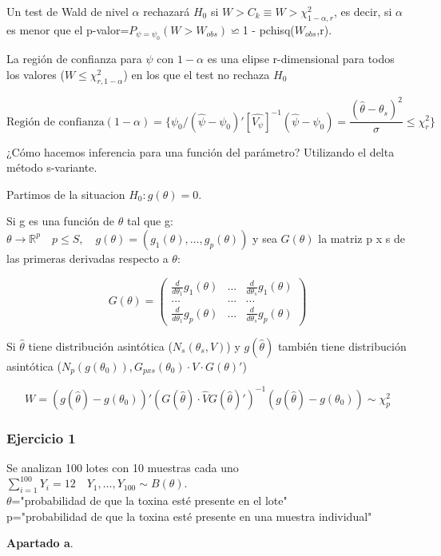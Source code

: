 Un test de Wald de nivel $\alpha$ rechazará $H_0$ si $W>C_k\equiv W>\chi^2_{1-\alpha,r}$, es decir, si
$\alpha$ es menor que el p-valor=$P_{\psi=\psi_0}(W>W_{obs})\backsimeq$1 - pchisq($W_{obs}$,r).

La región de confianza para $\psi$ con $1-\alpha$ es una elipse r-dimensional para todos los valores ($W \leq \chi^2_{r,1-\alpha}$) en los que el test no rechaza $H_0$

\[
\text{Región de confianza}(1-\alpha)=\{ \psi_0 /(\widehat{\psi}-\psi_0)'[\widehat{V_\psi}]^{-1}(\widehat{\psi}-\psi_0)=\frac{(\widehat{\theta}-\theta_s)^2}{\sigma}\leq\chi^2_r\}
\]

¿Cómo hacemos inferencia para una función del parámetro?
Utilizando el delta método s-variante.

Partimos de la situacion $H_0:g(\theta)=0$.

Si g es una función de $\theta$ tal que g:$\theta \to \mathbb{R}^p \quad p \leq S, \quad g(\theta)=(g_1(\theta),\dots,g_p(\theta))$
y sea $G(\theta)$ la matriz p x s de las primeras derivadas respecto a $\theta$:

\[
G(\theta)=
\begin{pmatrix}
    \frac{d}{d \theta_1} g_1(\theta) & \dots & \frac{d}{d \theta_s} g_1(\theta)\\
    \dots &\dots & \dots \\
    \frac{d}{d \theta_1} g_p(\theta) & \dots &\frac{d}{d \theta_s} g_p(\theta)
\end{pmatrix}
\]

Si $\widehat{\theta}$ tiene distribución asintótica ($N_s(\theta_s,V)$)
y $g(\widehat{\theta})$ también tiene distribución asintótica ($N_p(g(\theta_0)),G_{pxs}(\theta_0)\cdot V \cdot G(\theta)'$)

\[
W=(g(\widehat{\theta})-g(\theta_0))'(G(\widehat{\theta})\cdot \widehat{V} G(\widehat{\theta})')^{-1}(g(\widehat{\theta})-g(\theta_0)) \sim \chi^2_p
\]

\subsubsection*{Ejercicio 1}
Se analizan 100 lotes con 10 muestras cada uno $\sum_{i=1}^{100}Y_i=12 \quad Y_1,\dots,Y_{100} \sim B(\theta)$.
\\$\theta$="probabilidad de que la toxina esté presente en el lote"
\\ p="probabilidad de que la toxina esté presente en una muestra individual"

\textbf{Apartado a}.

